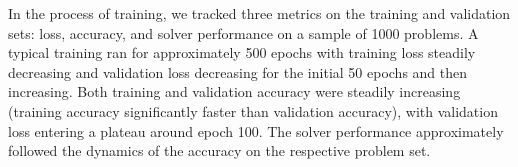 In the process of training,
we tracked three metrics on the training and validation sets:
loss, accuracy, and solver performance on a sample of 1000 problems.
A typical training ran for approximately 500 epochs
with training loss steadily decreasing and
validation loss decreasing for the initial 50 epochs and then increasing.
Both training and validation accuracy were steadily increasing (training accuracy significantly faster than validation accuracy),
with validation loss entering a plateau around epoch 100.
The solver performance approximately followed the dynamics of the accuracy on the respective problem set.

%
